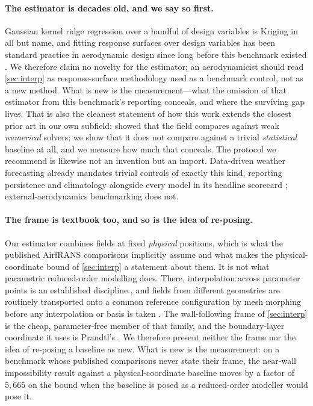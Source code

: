 \paragraph{The estimator is decades old, and we say so first.} Gaussian kernel ridge
regression over a handful of design variables is Kriging in all but name, and fitting
response surfaces over design variables has been standard practice in aerodynamic design
since long before this benchmark existed \citep{queipo2005surrogate}. We therefore claim no
novelty for the estimator; an aerodynamicist should read \autoref{sec:interp} as
response-surface methodology used as a benchmark control, not as a new method.
What is new is the measurement---what the omission of that estimator from this benchmark's
reporting conceals, and where the surviving gap lives. That is also the cleanest statement
of how this work extends the closest prior art in our own subfield:
\citet{mcgreivy2024weak} showed that the field compares against weak \emph{numerical}
solvers; we show that it does not compare against a trivial \emph{statistical} baseline at
all, and we measure how much that conceals. The protocol we recommend is likewise not an
invention but an import. Data-driven weather forecasting already mandates trivial controls
of exactly this kind, reporting persistence and climatology alongside every model in its
headline scorecard \citep{rasp2024weatherbench2}; external-aerodynamics benchmarking does
not.

\paragraph{The frame is textbook too, and so is the idea of re-posing.} Our estimator
combines fields at fixed \emph{physical} positions, which is what the published AirfRANS
comparisons implicitly assume and what makes the physical-coordinate bound of
\autoref{sec:interp} a statement about them. It is not what parametric reduced-order
modelling does. There, interpolation across parameter points is an established discipline
\citep{amsallem2008interpolation}, and fields from different geometries are routinely
transported onto a common reference configuration by mesh morphing before any
interpolation or basis is taken \citep{kabalan2024morphing}. The wall-following frame of
\autoref{sec:interp} is the cheap, parameter-free member of that family, and the
boundary-layer coordinate it uses is Prandtl's \citep{schlichting2017boundary}. We therefore
present neither the frame nor the idea of re-posing a baseline as new. What is new is the
measurement: on a benchmark whose published comparisons never state their frame, the
near-wall impossibility result against a physical-coordinate baseline moves by a factor of
$5{,}665$ on the bound when the baseline is posed as a reduced-order modeller would pose
it.

